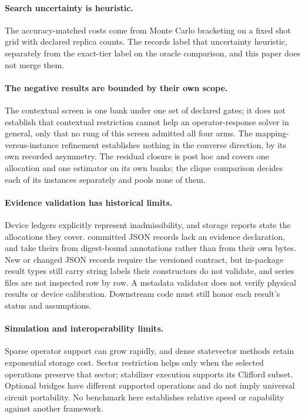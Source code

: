 \documentclass[aps,pra,reprint,superscriptaddress,nofootinbib,floatfix,
  showkeys]{revtex4-2}
\begin{document}
\paragraph{Search uncertainty is heuristic.}  The accuracy-matched costs come
from Monte Carlo bracketing on a fixed shot grid with declared replica counts.
The records label that uncertainty heuristic, separately from the exact-tier
label on the oracle comparison, and this paper does not merge them.

\paragraph{The negative results are bounded by their own scope.}  The contextual
screen is one bank under one set of declared gates; it does not establish that
contextual restriction cannot help an operator-response solver in general, only
that no rung of this screen admitted all four arms.  The
mapping-versus-instance refinement establishes nothing in the converse
direction, by its own recorded asymmetry.  The residual closure is post hoc and
covers one allocation and one estimator on its own banks; the clique comparison
decides each of its instances separately and pools none of them.

\paragraph{Evidence validation has historical limits.} Device ledgers explicitly
represent inadmissibility, and storage reports state the allocations they cover.
\cqcRecordsUnlabelled{} committed JSON records lack an evidence declaration, and
\cqcRecordsAnnotated{} take theirs from digest-bound annotations rather than from
their own bytes. New or changed JSON records require the versioned contract, but
in-package result types still carry string labels their constructors do not
validate, and series files are not inspected row by row. A metadata validator
does not verify physical results or device calibration. Downstream code must
still honor each result's status and assumptions.

\paragraph{Simulation and interoperability limits.} Sparse operator support can
grow rapidly, and dense statevector methods retain exponential storage cost.
Sector restriction helps only when the selected operations preserve that sector;
stabilizer execution supports its Clifford subset. Optional bridges have
different supported operations and do not imply universal circuit portability.
No benchmark here establishes relative speed or capability against another
framework.
\end{document}
